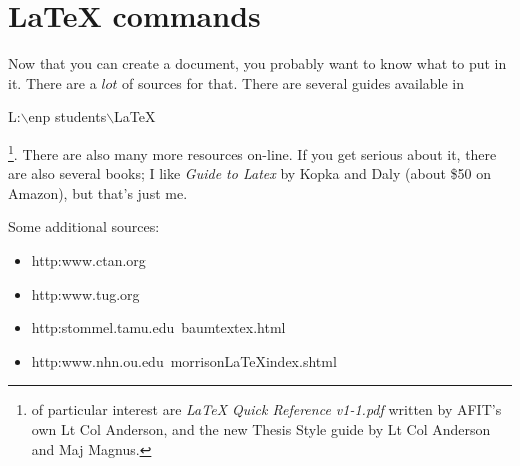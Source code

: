 \documentclass[10pt,journal]{ieeetran}
\begin{document}
\section{LaTeX commands}
Now that you can create a document, you probably want to know what
to put in it.  There are a $lot$ of sources for that.  There are
several guides available in \begin{ttfamily}L:$\backslash$enp
students$\backslash$LaTeX\end{ttfamily}\footnote{of particular
interest are \emph{LaTeX Quick Reference v1-1.pdf} written by
AFIT's own Lt Col Anderson, and the new Thesis Style guide by Lt
Col Anderson and Maj Magnus.}. There are also many more resources
on-line. If you get serious about it, there are also several
books; I like \emph{Guide to Latex} by Kopka and Daly (about \$50
on Amazon), but that's just me.

Some additional sources:
\begin{itemize}
    \item  http:\/\/www.ctan.org\/
    \item  http:\/\/www.tug.org\/
    \item  http:\/\/stommel.tamu.edu\/~baum\/tex\/tex.html
    \item
        http:\/\/www.nhn.ou.edu\/~morrison\/LaTeX\/index.shtml
\end{itemize}
\end{document}
